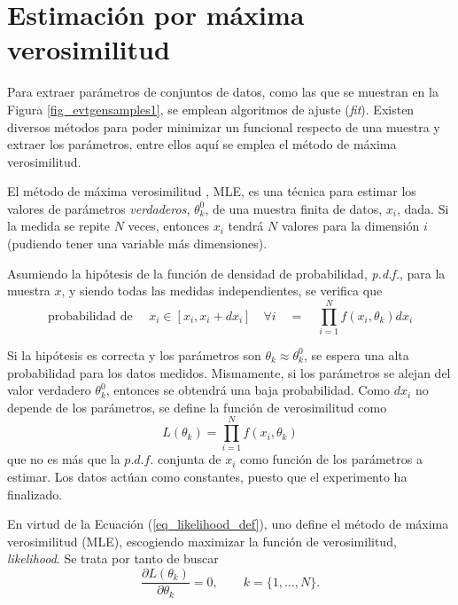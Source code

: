 
\color{norm}



\section{Estimación por máxima verosimilitud}

\color{new}
Para extraer parámetros de conjuntos de datos, como las que se muestran en la Figura \ref{fig_evtgensamples1}, se emplean algoritmos de ajuste (\emph{fit}). Existen diversos métodos para poder minimizar un funcional respecto de una muestra y extraer los parámetros, entre ellos aquí se emplea el método de máxima verosimilitud.

\color{norm}

El método de máxima verosimilitud \cite{cowan}, MLE, es una técnica para estimar los valores de parámetros \emph{verdaderos}, $\theta_k^0$, de una muestra finita de datos, $x_i$, dada. Si la medida se repite $N$ veces, entonces $x_i$ tendrá $N$ valores para la dimensión $i$ (pudiendo tener una variable más dimensiones).



Asumiendo la hipótesis de la función de densidad de probabilidad, \emph{p.d.f.}, para la muestra $x$, y siendo todas las medidas independientes, se verifica que
\begin{equation}
\text{probabilidad de } \quad x_i \in [x_i, x_i+dx_i] \quad \forall i \quad  = \quad \prod_{i=1}^N f(x_i,\theta_k) dx_i	
\end{equation}




Si la hipótesis es correcta y los parámetros son $\theta_k \approx \theta_k^0$, se espera una alta probabilidad para los datos medidos. Mismamente, si los parámetros se alejan del valor verdadero $\theta_k^0$, entonces se obtendrá una baja probabilidad.
Como  $dx_i$ no depende de los parámetros, se define la función de verosimilitud como
\begin{equation}
	L(\theta_k) = \prod_{i=1}^N f(x_i,\theta_k) \label{eq_likelihood_def}
\end{equation}  
que no es más que la \color{dieg} $p.d.f.$ conjunta de $x_i$ como función de los parámetros a estimar. \color{norm} Los datos actúan como constantes, puesto que el experimento ha finalizado.


En virtud de la Ecuación (\ref{eq_likelihood_def}), 
uno define el método de máxima verosimilitud (MLE), escogiendo maximizar la función de verosimilitud, \emph{likelihood}. Se trata por tanto de buscar
\begin{equation}
	\frac{\partial L(\theta_k)}{\partial \theta_k} = 0, \qquad k=\{1,\dots,N\}.
\end{equation}

